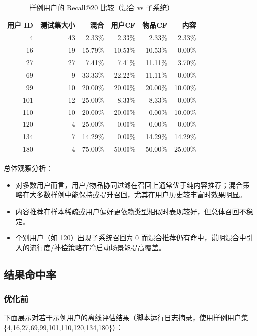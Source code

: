 \begin{table}[htbp]
\centering
\begin{tabular}{r r r r r r}
\hline
用户 ID & 测试集大小 & 混合 & 用户CF & 物品CF & 内容 \\
\hline
4   & 43 & 2.33\%  & 2.33\%  & 2.33\%  & 2.33\% \\
16  & 19 & 15.79\% & 10.53\% & 10.53\% & 0.00\% \\
27  & 27 & 7.41\%  & 7.41\%  & 11.11\% & 3.70\% \\
69  & 9  & 33.33\% & 22.22\% & 11.11\% & 0.00\% \\
99  & 10 & 20.00\% & 20.00\% & 20.00\% & 10.00\% \\
101 & 12 & 25.00\% & 8.33\%  & 8.33\%  & 0.00\% \\
110 & 10 & 20.00\% & 20.00\% & 0.00\%  & 10.00\% \\
120 & 4  & 25.00\% & 0.00\%  & 0.00\%  & 0.00\% \\
134 & 7  & 14.29\% & 0.00\%  & 14.29\% & 14.29\% \\
180 & 4  & 75.00\% & 50.00\% & 50.00\% & 25.00\% \\
\hline
\end{tabular}
\caption{样例用户的 Recall@20 比较（混合 vs 子系统）}
\end{table}

总体观察分析：
\begin{itemize}
  \item 对多数用户而言，用户/物品协同过滤在召回上通常优于纯内容推荐；混合策略在大多数样例中能保持或提升召回，尤其在用户历史较丰富时效果明显。
  \item 内容推荐在样本稀疏或用户偏好更依赖类型相似时表现较好，但总体召回不稳定。
  \item 个别用户（如 120）出现子系统召回为 0 而混合推荐仍有命中，说明混合中引入的流行度/补偿策略在冷启动场景能提高覆盖。
\end{itemize}

\subsection{结果命中率}

\subsubsection{优化前}
下面展示对若干示例用户的离线评估结果（脚本运行日志摘录，使用样例用户集 \{4,16,27,69,99,101,110,120,134,180\}）：

